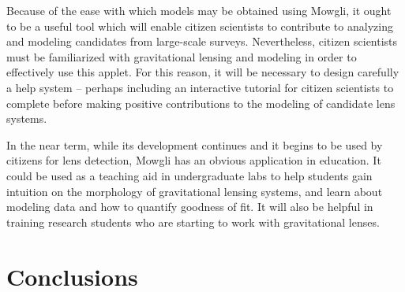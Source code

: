 \documentclass[iop]{emulateapj}
\def\theapplet{{\sc Mowgli}\xspace}
\begin{document}
Because of the ease with which models may be obtained using \theapplet, it
ought to be a useful tool which will enable citizen scientists to contribute
to analyzing and modeling candidates from large-scale surveys. Nevertheless,
citizen scientists must be familiarized with gravitational lensing and
modeling in order to effectively use this applet. For this reason, it will be
necessary to design carefully a help system -- perhaps including  an
interactive tutorial for citizen scientists to complete before making positive
contributions to the modeling of candidate lens systems.  

In the near term, while its development continues and it begins to be used by
citizens for lens detection, \theapplet has an obvious application in
education. It could be used as a teaching aid in undergraduate labs to help
students gain intuition on the morphology of gravitational lensing systems,
and learn about modeling data and how to quantify goodness of fit. It will
also be helpful in training research students who are starting to work with
gravitational lenses.



\section{Conclusions}
\label{sec:concl}
\end{document}
